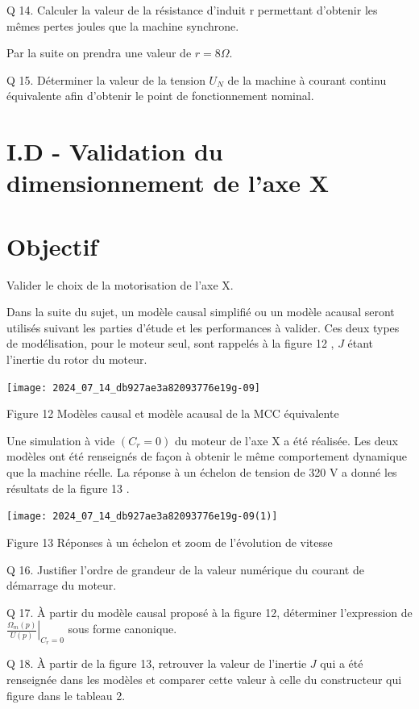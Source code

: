 \documentclass[10pt]{article}
\begin{document}
Q 14. Calculer la valeur de la résistance d'induit r permettant d'obtenir les mêmes pertes joules que la machine synchrone.

Par la suite on prendra une valeur de $r=8 \Omega$.

Q 15. Déterminer la valeur de la tension $U_{N}$ de la machine à courant continu équivalente afin d'obtenir le point de fonctionnement nominal.

\section*{I.D - Validation du dimensionnement de l'axe $\boldsymbol{X}$}
\section*{Objectif}
Valider le choix de la motorisation de l'axe X.

Dans la suite du sujet, un modèle causal simplifié ou un modèle acausal seront utilisés suivant les parties d'étude et les performances à valider. Ces deux types de modélisation, pour le moteur seul, sont rappelés à la figure 12 , $J$ étant l'inertie du rotor du moteur.

\begin{center}
\texttt{[image: 2024\_07\_14\_db927ae3a82093776e19g-09]}
\end{center}

Figure 12 Modèles causal et modèle acausal de la MCC équivalente

Une simulation à vide $\left(C_{r}=0\right)$ du moteur de l'axe X a été réalisée. Les deux modèles ont été renseignés de façon à obtenir le même comportement dynamique que la machine réelle. La réponse à un échelon de tension de 320 V a donné les résultats de la figure 13 .

\begin{center}
\texttt{[image: 2024\_07\_14\_db927ae3a82093776e19g-09(1)]}
\end{center}

Figure 13 Réponses à un échelon et zoom de l'évolution de vitesse

Q 16. Justifier l'ordre de grandeur de la valeur numérique du courant de démarrage du moteur.

Q 17. À partir du modèle causal proposé à la figure 12, déterminer l'expression de $\left.\frac{\Omega_{m}(p)}{U(p)}\right|_{C_{r}=0}$ sous forme canonique.

Q 18. À partir de la figure 13, retrouver la valeur de l'inertie $J$ qui a été renseignée dans les modèles et comparer cette valeur à celle du constructeur qui figure dans le tableau 2.
\end{document}
